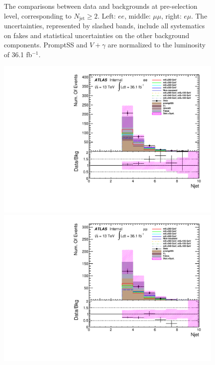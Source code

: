 \begin{figure}[h]
\begin{minipage}[t]{0.33\linewidth}
\end{minipage}
 \caption{The comparisons between data and backgrounds at pre-selection level, corresponding to $N_{\text{jet}}\geq2$. Left: $ee$, middle: $\mu\mu$, right: $e\mu$. The uncertainties, represented by slashed bands, include all systematics on fakes and statistical uncertainties on the other background components. PromptSS and $V+\gamma$ are normalized to the luminosity of 36.1 fb$^{-1}$.}
\label{fig:dataMC_low_Njet_CR:numOfjet}
\end{figure}

\begin{figure}[h]
\begin{minipage}[t]{0.33\linewidth}
\centering
\includegraphics[width=1.0\textwidth,angle=-90]{fig/dataMC_high_Njet_CR/numOfjet_ee.pdf}
\end{minipage}
\begin{minipage}[t]{0.33\linewidth}
\centering
\includegraphics[width=1.0\textwidth,angle=-90]{fig/dataMC_high_Njet_CR/numOfjet_mumu.pdf}

\end{minipage}
\end{figure}
